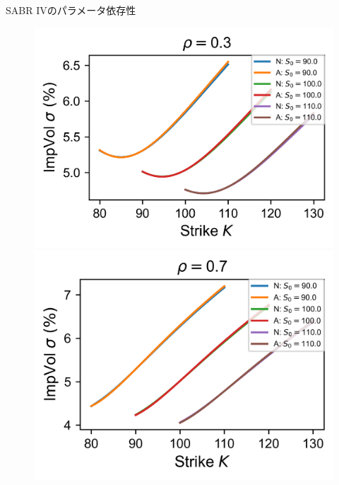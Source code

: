 \documentclass[dvipdfmx,9pt]{beamer}
\begin{document}
\begin{frame}{SABR IVのパラメータ依存性}
  \begin{figure}
    \begin{minipage}[b]{0.48\linewidth}
      \raggedleft
      \includegraphics[width=0.7\linewidth]{image/corr/SABR_graph_0.3.png}
    \end{minipage}
    \hfill
    \begin{minipage}[b]{0.48\linewidth}
      \raggedright
      \includegraphics[width=0.7\linewidth]{image/corr/SABR_graph_0.7.png}
    \end{minipage}
  \end{figure}

\end{frame}
\end{document}
